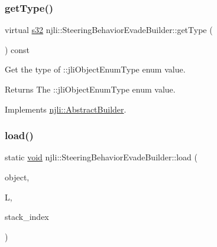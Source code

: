 \mbox{\label{classnjli_1_1_steering_behavior_evade_builder_aae11d5b1325c0938ddb7f9b22572a48d}} 
\subsubsection{\texorpdfstring{get\+Type()}{getType()}}
{\footnotesize\ttfamily virtual \mbox{\hyperlink{_util_8h_aa62c75d314a0d1f37f79c4b73b2292e2}{s32}} njli\+::\+Steering\+Behavior\+Evade\+Builder\+::get\+Type (\begin{DoxyParamCaption}{ }\end{DoxyParamCaption}) const\hspace{0.3cm}{\ttfamily [virtual]}}

Get the type of \+::jli\+Object\+Enum\+Type enum value.

\begin{DoxyReturn}{Returns}
The \+::jli\+Object\+Enum\+Type enum value. 
\end{DoxyReturn}


Implements \mbox{\hyperlink{classnjli_1_1_abstract_builder_abb4a8161cd71be12807fe85864b67050}{njli\+::\+Abstract\+Builder}}.

\mbox{\label{classnjli_1_1_steering_behavior_evade_builder_a4c45f5567afe5062f152933c8cac55e1}} 
\subsubsection{\texorpdfstring{load()}{load()}}
{\footnotesize\ttfamily static \mbox{\hyperlink{_thread_8h_af1e856da2e658414cb2456cb6f7ebc66}{void}} njli\+::\+Steering\+Behavior\+Evade\+Builder\+::load (\begin{DoxyParamCaption}\item[{\mbox{\hyperlink{classnjli_1_1_steering_behavior_evade_builder}{Steering\+Behavior\+Evade\+Builder}} \&}]{object,  }\item[{lua\+\_\+\+State $\ast$}]{L,  }\item[{int}]{stack\+\_\+index }\end{DoxyParamCaption})\hspace{0.3cm}{\ttfamily [static]}}

